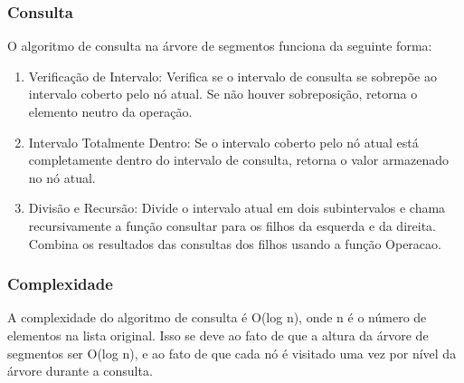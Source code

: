 \documentclass{article}
\begin{document}
\subsubsection{Consulta}
O algoritmo de consulta na árvore de segmentos funciona da seguinte forma:
\begin{enumerate}
\item Verificação de Intervalo: Verifica se o intervalo de consulta se sobrepõe ao
  intervalo coberto pelo nó atual. Se não houver sobreposição, retorna o elemento neutro da operação.
\item Intervalo Totalmente Dentro: Se o intervalo coberto pelo nó atual está completamente 
  dentro do intervalo de consulta, retorna o valor armazenado no nó atual.
\item Divisão e Recursão: Divide o intervalo atual em dois subintervalos e chama recursivamente
  a função consultar para os filhos da esquerda e da direita. Combina os resultados das consultas dos filhos usando a função Operacao.
\end{enumerate}
\subsubsection{Complexidade}
A complexidade do algoritmo de consulta é O(log n), onde n é o número
de elementos na lista original. Isso se deve ao fato de que a altura da árvore de segmentos
ser O(log n), e ao fato de que cada nó é visitado uma vez por nível da árvore durante a consulta.
\end{document}
